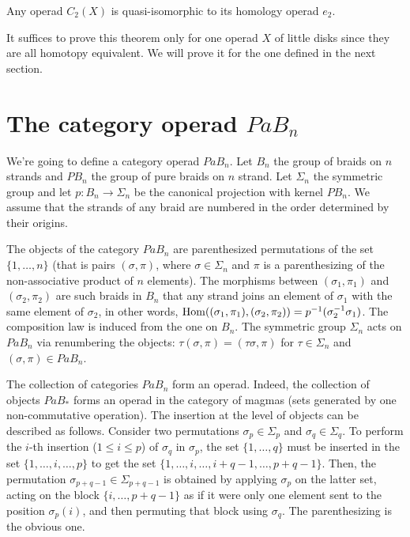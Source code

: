 \documentclass[TFM.tex]{subfiles}
\begin{document}
\begin{thm}
Any operad $C_2(X)$ is quasi-isomorphic to its homology operad $e_2$.
\end{thm}

It suffices to prove this theorem only for one operad $X$ of little disks since they are all homotopy equivalent. We will prove it for the one defined in the next section.

\section{The category operad $PaB_n$}\label{pab}

We're going to define a category operad $PaB_n$. Let $B_n$ the group of braids on $n$ strands and $PB_n$ the group of pure braids on $n$ strand. Let $\Sigma_n$ the symmetric group and let $p:B_n\to \Sigma_n$ be the canonical projection with kernel $PB_n$. We assume that the strands of any braid are numbered in the order determined by their origins. 

The objects of the category $PaB_n$ are parenthesized permutations of the set $\{1,\dots, n\}$ (that is pairs $(\sigma,\pi)$, where $\sigma\in\Sigma_n$ and $\pi$ is a parenthesizing of the non-associative product of $n$ elements). The morphisms between $(\sigma_1,\pi_1)$ and $(\sigma_2,\pi_2)$ are such braids in $B_n$ that any strand joins an element of $\sigma_1$ with the same element of $\sigma_2$, in other words, $\operatorname{Hom}((\sigma_1,\pi_1),(\sigma_2,\pi_2))=p^{-1}(\sigma_2^{-1}\sigma_1)$. The composition law is induced from the one on $B_n$. The symmetric group $\Sigma_n$ acts on $PaB_n$ via renumbering the objects: $\tau(\sigma,\pi)=(\tau\sigma,\pi)$ for $\tau\in\Sigma_n$ and $(\sigma,\pi)\in PaB_n$. 


The collection of categories $PaB_n$ form an operad. Indeed, the collection of objects $PaB_*$ forms an operad in the category of magmas (sets generated by one non-commutative operation). The insertion at the level of objects can be described as follows. Consider two permutations $\sigma_p\in\Sigma_p$ and $\sigma_q\in\Sigma_q$. To perform the $i$-th insertion ($1\leq i\leq p$) of $\sigma_q$ in $\sigma_p$, the set $\{1,\dots, q\}$ must be inserted in the set $\{1,\dots, i,\dots, p\}$ to get the set $\{1,\dots, i,\dots,i+q-1,\dots, p+q-1\}$. Then, the permutation $\sigma_{p+q-1}\in\Sigma_{p+q-1}$ is obtained by applying $\sigma_p$ on the latter set, acting on the block $\{i,\dots, p+q-1\}$ as if it were only one element sent to the position $\sigma_p(i)$, and then permuting that block using $\sigma_q$. The parenthesizing is the obvious one. 
\end{document}
